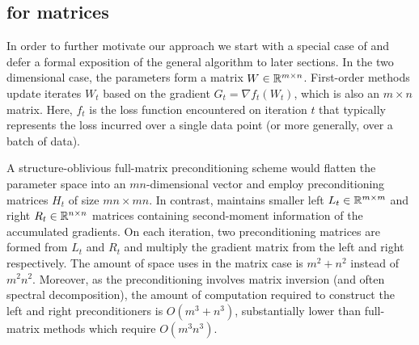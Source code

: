 \begin{algorithm}[t!]
\caption{\NAME, matrix case.}
\label{alg:sham2d}
\end{algorithm}

\subsection{\NAME for matrices}

In order to further motivate our approach we start with a special case of
\NAME and defer a formal exposition of the general algorithm to later
sections.  In the two dimensional case, the parameters form a matrix
$W\in\mathbb{R}^{m\times n}$.
First-order methods update iterates $W_t$ based on the gradient $G_t=\nabla
f_t(W_t)$, which is also an $m \times n$ matrix. Here, $f_t$ is the
loss function encountered on iteration $t$ that typically represents the loss
incurred over a single data point (or more generally, over a batch of data).

A structure-oblivious full-matrix preconditioning scheme
would flatten the parameter space into an $mn$-dimensional vector
and employ preconditioning matrices $H_t$ of size $mn\times mn$. 
In contrast, \NAME %
maintains smaller {left} $L_t\in\mathbb{R}^{m\times m}$ and right
$R_t\in\mathbb{R}^{n\times n}$ matrices containing second-moment information of the accumulated
gradients. 
On each iteration, two preconditioning matrices are formed from
$L_t$ and $R_t$ and multiply the gradient matrix from the left and right
respectively. 
The amount of space \NAME uses in the matrix case is
$m^2 + n^2$ instead of $m^2 n^2$. Moreover, as the preconditioning involves
matrix inversion (and often spectral decomposition), the amount of computation required
to construct the left and right preconditioners is $O(m^3 + n^3)$,
substantially lower than full-matrix methods which require $O(m^3 n^3)$.


